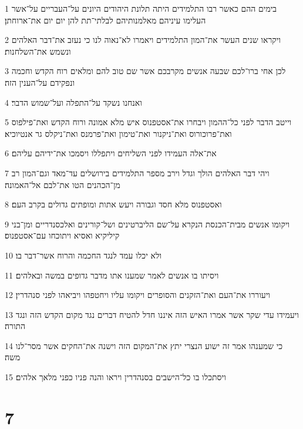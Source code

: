 \par 1 בימים ההם כאשר רבו התלמידים היתה תלונת היהודים היונים על־העבריים על־אשר העלימו עיניהם מאלמנותיהם לבלתי־תת להן יום יום את־ארוחתן׃
\par 2 ויקראו שנים העשר את־המון התלמידים ויאמרו לא־נאוה לנו כי נעזב את־דבר האלהים ונשמש את־השלחנות׃
\par 3 לכן אחי ברו־לכם שבעה אנשים מקרבכם אשר שם טוב להם ומלאים רוח הקדש וחכמה ונפקידם על־הענין הזה׃
\par 4 ואנחנו נשקד על־התפלה ועל־שמוש הדבר׃
\par 5 וייטב הדבר לפני כל־ההמון ויבחרו את־אסטפנוס איש מלא אמונה ורוח הקדש ואת־פילפוס ואת־פרוכורוס ואת־ניקנור ואת־טימון ואת־פרמנס ואת־ניקלס גר אנטיוכיא׃
\par 6 את־אלה העמידו לפני השליחים ויתפללו ויסמכו את־ידיהם עליהם׃
\par 7 ויהי דבר האלהים הולך וגדל וירב מספר התלמידים בירושלים עד־מאד וגם־המון רב מן־הכהנים הטו את־לבם אל־האמונה׃
\par 8 ואסטפנוס מלא חסד וגבורה ויעש אתות ומופתים גדולים בקרב העם׃
\par 9 ויקומו אנשים מבית־הכנסת הנקרא על־שם הליברטינים ושל־קורינים ואלכסנדריים ומן־בני קיליקיא ואסיא ויתוכחו עם־אסטפנוס׃
\par 10 ולא יכלו עמד לנגד החכמה והרוח אשר־דבר בו׃
\par 11 ויסיתו בו אנשים לאמר שמענו אתו מדבר גדופים במשה ובאלהים׃
\par 12 ויעוררו את־העם ואת־הזקנים והסופרים ויקומו עליו ויחטפהו ויביאהו לפני סנהדרין׃
\par 13 ויעמידו עדי שקר אשר אמרו האיש הזה איננו חדל להטיח דברים נגד מקום הקדש הזה ונגד התורה׃
\par 14 כי שמענהו אמר זה ישוע הנצרי יתץ את־המקום הזה וישנה את־החקים אשר מסר־לנו משה׃
\par 15 ויסתכלו בו כל־הישבים בסנהדרין ויראו והנה פניו כפני מלאך אלהים׃

\chapter{7}

